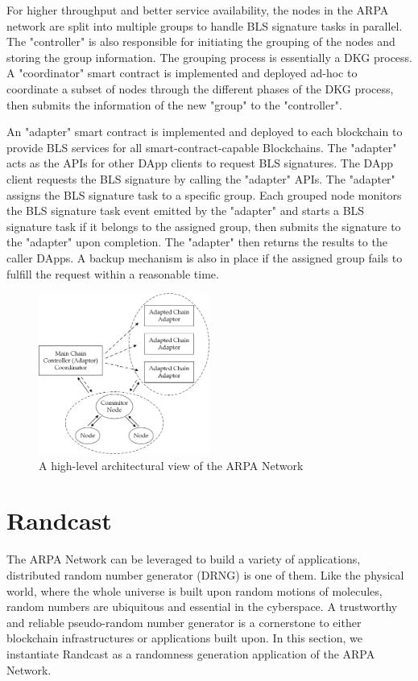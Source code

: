 \documentclass[11pt]{article}
\begin{document}
For higher throughput and better service availability, the nodes in the ARPA network are split into multiple groups to handle BLS signature tasks in parallel. The "controller" is also responsible for initiating the grouping of the nodes and storing the group information. The grouping process is essentially a DKG process. A "coordinator" smart contract is implemented and deployed ad-hoc to coordinate a subset of nodes through the different phases of the DKG process, then submits the information of the new "group" to the "controller".

An "adapter" smart contract is implemented and deployed to each blockchain to provide BLS services for all smart-contract-capable Blockchains. The "adapter" acts as the APIs for other DApp clients to request BLS signatures. The DApp client requests the BLS signature by calling the "adapter" APIs. The "adapter" assigns the BLS signature task to a specific group. Each grouped node monitors the BLS signature task event emitted by the "adapter" and starts a BLS signature task if it belongs to the assigned group, then submits the signature to the "adapter" upon completion. The "adapter" then returns the results to the caller DApps. A backup mechanism is also in place if the assigned group fails to fulfill the request within a reasonable time.

\begin{figure}
    \centering
    \includegraphics[width=0.5\textwidth]{figures/arpa network high level architecture.png}
    \caption{A high-level architectural view of the ARPA Network}
    \label{fig:arch}
\end{figure}

\section{Randcast}

The ARPA Network can be leveraged to build a variety of applications, distributed random number generator (DRNG) is one of them. Like the physical world, where the whole universe is built upon random motions of molecules, random numbers are ubiquitous and essential in the cyberspace. A trustworthy and reliable pseudo-random number generator is a cornerstone to either blockchain infrastructures or applications built upon. In this section, we instantiate Randcast as a randomness generation application of the ARPA Network.
\end{document}
